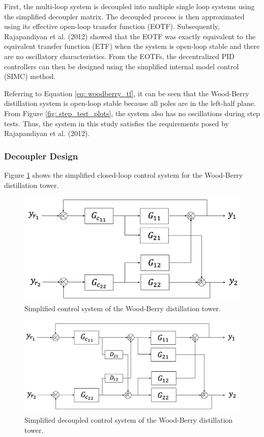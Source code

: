 First, the multi-loop system is decoupled into multiple single loop systems using the simplified decoupler matrix.  The decoupled process is then approximated using its effective open-loop transfer function (EOTF).  Subsequently, Rajapandiyan et al. (2012) showed that the EOTF was exactly equivalent to the equivalent transfer function (ETF) when the system is open-loop stable and there are no oscillatory characteristics.  From the EOTFs, the decentralized PID controllers can then be designed using the simplified internal model control (SIMC) method. 

Referring to Equation \ref{eq: woodberry_tf}, it can be seen that the Wood-Berry distillation system is open-loop stable because all poles are in the left-half plane.  From Figure \ref{fig: step_test_plots}, the system also has no oscillations during step tests. Thus, the system in this study satisfies the requirements posed by Rajapandiyan et al. (2012). 

\subsubsection{Decoupler Design}
Figure \ref{fig: control_loop_IOL} shows the simplified closed-loop control system for the Wood-Berry distillation tower.  

\begin{figure}
    \centering
    \includegraphics[scale=0.45]{images/pid_loop_iol.png}
    \caption{Simplified control system of the Wood-Berry distillation tower.}
    \label{fig: control_loop_IOL}
\end{figure}

\begin{figure}
    \centering
    \includegraphics[scale=0.39]{images/decoupled_pid_loop_iol.png}
    \caption{Simplified decoupled control system of the Wood-Berry distillation tower.}
    \label{fig: decoupled_control_loop_IOL}
\end{figure}

